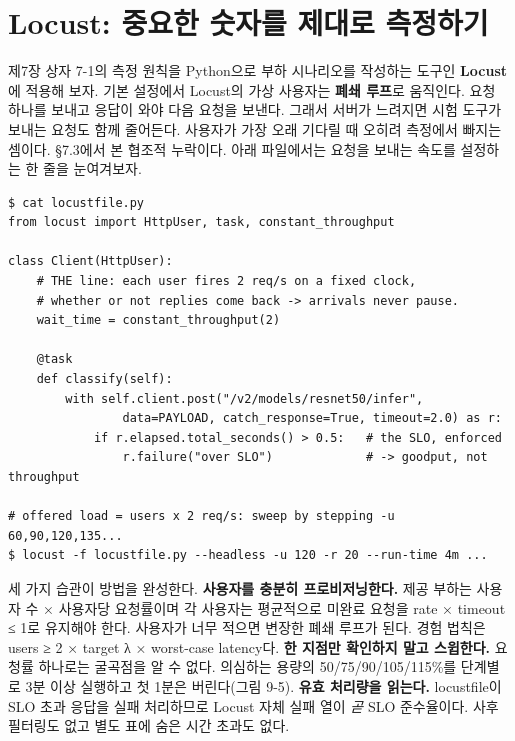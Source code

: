 \section{Locust: 중요한 숫자를 제대로 측정하기}

제7장 상자 7-1의 측정 원칙을 Python으로 부하 시나리오를 작성하는 도구인 \textbf{Locust}에 적용해 보자. 기본 설정에서 Locust의 가상 사용자는 \textbf{폐쇄 루프}로 움직인다. 요청 하나를 보내고 응답이 와야 다음 요청을 보낸다. 그래서 서버가 느려지면 시험 도구가 보내는 요청도 함께 줄어든다. 사용자가 가장 오래 기다릴 때 오히려 측정에서 빠지는 셈이다. §7.3에서 본 협조적 누락이다. 아래 파일에서는 요청을 보내는 속도를 설정하는 한 줄을 눈여겨보자.

\begin{terminalbox}
\begin{Verbatim}[breaklines=true,breakanywhere=true,fontsize=\small,formatcom=\color{tbbtermfg},codes=\tbbcodeactive]
$ cat locustfile.py
from locust import HttpUser, task, constant_throughput

class Client(HttpUser):
    # THE line: each user fires 2 req/s on a fixed clock,
    # whether or not replies come back -> arrivals never pause.
    wait_time = constant_throughput(2)

    @task
    def classify(self):
        with self.client.post("/v2/models/resnet50/infer",
                data=PAYLOAD, catch_response=True, timeout=2.0) as r:
            if r.elapsed.total_seconds() > 0.5:   # the SLO, enforced
                r.failure("over SLO")             # -> goodput, not throughput

# offered load = users x 2 req/s: sweep by stepping -u 60,90,120,135...
$ locust -f locustfile.py --headless -u 120 -r 20 --run-time 4m ...
\end{Verbatim}
\end{terminalbox}

세 가지 습관이 방법을 완성한다. \textbf{사용자를 충분히 프로비저닝한다.} 제공 부하는 사용자 수 × 사용자당 요청률이며 각 사용자는 평균적으로 미완료 요청을 rate × timeout ≤ 1로 유지해야 한다. 사용자가 너무 적으면 변장한 폐쇄 루프가 된다. 경험 법칙은 users ≥ 2 × target λ × worst-case latency다. \textbf{한 지점만 확인하지 말고 스윕한다.} 요청률 하나로는 굴곡점을 알 수 없다. 의심하는 용량의 50/75/90/105/115\%를 단계별로 3분 이상 실행하고 첫 1분은 버린다(그림 9-5). \textbf{유효 처리량을 읽는다.} locustfile이 SLO 초과 응답을 실패 처리하므로 Locust 자체 실패 열이 \textit{곧} SLO 준수율이다. 사후 필터링도 없고 별도 표에 숨은 시간 초과도 없다.


